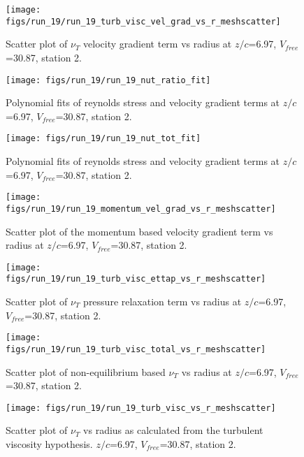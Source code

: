 \begin{figure}[H]
\centering
\texttt{[image: figs/run\_19/run\_19\_turb\_visc\_vel\_grad\_vs\_r\_meshscatter]}
\caption{Scatter plot of $\nu_T$ velocity gradient term vs radius at $z/c$=6.97, $V_{free}$=30.87, station 2.}
\end{figure}


\begin{figure}[H]
\centering
\texttt{[image: figs/run\_19/run\_19\_nut\_ratio\_fit]}
\caption{Polynomial fits of reynolds stress and velocity gradient terms at $z/c$=6.97, $V_{free}$=30.87, station 2.}
\end{figure}


\begin{figure}[H]
\centering
\texttt{[image: figs/run\_19/run\_19\_nut\_tot\_fit]}
\caption{Polynomial fits of reynolds stress and velocity gradient terms at $z/c$=6.97, $V_{free}$=30.87, station 2.}
\end{figure}


\begin{figure}[H]
\centering
\texttt{[image: figs/run\_19/run\_19\_momentum\_vel\_grad\_vs\_r\_meshscatter]}
\caption{Scatter plot of the momentum based velocity gradient term vs radius at $z/c$=6.97, $V_{free}$=30.87, station 2.}
\end{figure}


\begin{figure}[H]
\centering
\texttt{[image: figs/run\_19/run\_19\_turb\_visc\_ettap\_vs\_r\_meshscatter]}
\caption{Scatter plot of $\nu_T$ pressure relaxation term vs radius at $z/c$=6.97, $V_{free}$=30.87, station 2.}
\end{figure}


\begin{figure}[H]
\centering
\texttt{[image: figs/run\_19/run\_19\_turb\_visc\_total\_vs\_r\_meshscatter]}
\caption{Scatter plot of non-equilibrium based $\nu_T$ vs radius at $z/c$=6.97, $V_{free}$=30.87, station 2.}
\end{figure}


\begin{figure}[H]
\centering
\texttt{[image: figs/run\_19/run\_19\_turb\_visc\_vs\_r\_meshscatter]}
\caption{Scatter plot of $\nu_T$ vs radius as calculated from the turbulent viscosity hypothesis. $z/c$=6.97, $V_{free}$=30.87, station 2.}
\end{figure}



